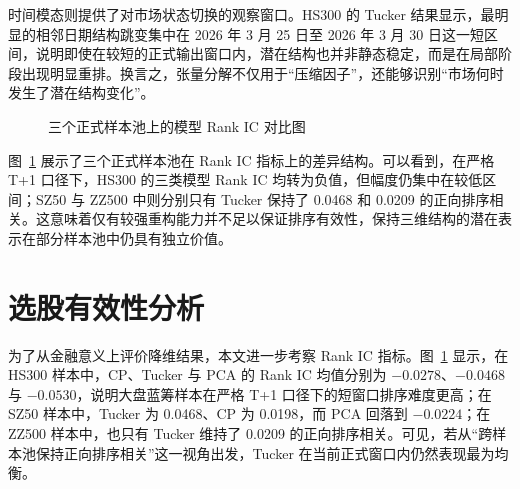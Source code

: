 时间模态则提供了对市场状态切换的观察窗口。HS300 的 Tucker 结果显示，最明显的相邻日期结构跳变集中在 2026 年 3 月 25 日至 2026 年 3 月 30 日这一短区间，说明即使在较短的正式输出窗口内，潜在结构也并非静态稳定，而是在局部阶段出现明显重排。换言之，张量分解不仅用于“压缩因子”，还能够识别“市场何时发生了潜在结构变化”。

\begin{figure}[!t]
\centering
{}
\caption{三个正式样本池上的模型 Rank IC 对比图}
\label{fig:rankic}
\end{figure}

图~\ref{fig:rankic} 展示了三个正式样本池在 Rank IC 指标上的差异结构。可以看到，在严格 T+1 口径下，HS300 的三类模型 Rank IC 均转为负值，但幅度仍集中在较低区间；SZ50 与 ZZ500 中则分别只有 Tucker 保持了 0.0468 和 0.0209 的正向排序相关。这意味着仅有较强重构能力并不足以保证排序有效性，保持三维结构的潜在表示在部分样本池中仍具有独立价值。

\section{选股有效性分析}

为了从金融意义上评价降维结果，本文进一步考察 Rank IC 指标。图~\ref{fig:rankic} 显示，在 HS300 样本中，CP、Tucker 与 PCA 的 Rank IC 均值分别为 $-0.0278$、$-0.0468$ 与 $-0.0530$，说明大盘蓝筹样本在严格 T+1 口径下的短窗口排序难度更高；在 SZ50 样本中，Tucker 为 0.0468、CP 为 0.0198，而 PCA 回落到 $-0.0224$；在 ZZ500 样本中，也只有 Tucker 维持了 0.0209 的正向排序相关。可见，若从“跨样本池保持正向排序相关”这一视角出发，Tucker 在当前正式窗口内仍然表现最为均衡。

